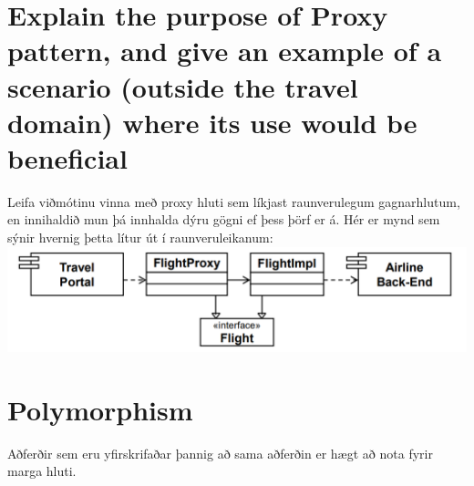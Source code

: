 \documentclass[openany]{article}
\begin{document}
\section{Explain the purpose of Proxy pattern, and give an example of a scenario (outside the travel domain) where its use would be beneficial}
Leifa viðmótinu vinna með proxy hluti sem líkjast raunverulegum gagnarhlutum, en innihaldið mun þá innhalda dýru gögni ef þess þörf er á. Hér er mynd sem sýnir hvernig þetta lítur út í raunveruleikanum:\\
\includegraphics[scale=0.8]{mynd} \\
\section{Polymorphism}
Aðferðir sem eru yfirskrifaðar þannig að sama aðferðin er hægt að nota fyrir marga hluti.
\end{document}
